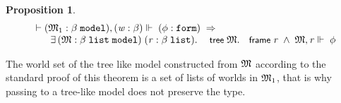 \documentclass{llncs}
\newtheorem{prop}[thm]{Proposition}
\newenvironment{holmath}{\begin{displaymath}\begin{array}{l}}{\end{array}\end{displaymath}\ignorespacesafterend}
\renewcommand{\HOLConst}[1]{{\textsf{\upshape\small #1}}}
\renewcommand{\HOLinline}[1]{\ensuremath{#1}}
\renewcommand{\HOLFieldName}[1]{\HOLConst{#1}}
\begin{document}
\begin{prop}
{\upshape\cite[Proposition 2.15]{Blackburn}}\label{2.15}
\begin{holmath}
  \ensuremath{\HOLTokenTurnstile}(\HOLFreeVar{\ensuremath{\mathfrak{M}}}\sb{\mathrm{1}} :\ensuremath{\beta}\;\HOLTyOp{model}),(\HOLFreeVar{w} :\ensuremath{\beta})\ensuremath{\Vdash}\;(\HOLFreeVar{\ensuremath{\phi}} :\HOLTyOp{form})\;\HOLSymConst{\HOLTokenImp{}}\\
\;\;\;\;\;\;\;\HOLSymConst{\HOLTokenExists{}}(\HOLBoundVar{\ensuremath{\mathfrak{M}}} :\ensuremath{\beta}\;\HOLTyOp{list}\;\HOLTyOp{model})\;(\HOLBoundVar{r} :\ensuremath{\beta}\;\HOLTyOp{list}).\;\HOLConst{tree}\;\HOLBoundVar{\ensuremath{\mathfrak{M}}}.\HOLFieldName{frame}\;\HOLBoundVar{r}\;\HOLSymConst{\HOLTokenConj{}}\;\HOLBoundVar{\ensuremath{\mathfrak{M}}},\HOLBoundVar{r}\ensuremath{\Vdash}\;\HOLFreeVar{\ensuremath{\phi}}
\end{holmath}
\end{prop}
The world set of the tree like model constructed from \HOLinline{\HOLFreeVar{\ensuremath{\mathfrak{M}}}} according to the standard proof of this theorem is a set of lists of worlds in \HOLinline{\HOLFreeVar{\ensuremath{\mathfrak{M}}}\sb{\mathrm{1}}}, that is why passing to a tree-like model does not preserve the type. 
\end{document}
